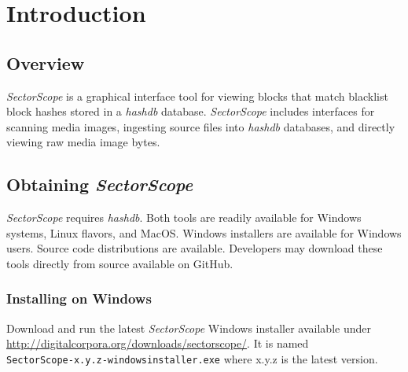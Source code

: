 \documentclass[11pt,fleqn]{article} %
\begin{document}
\newcommand \sscope {\textit{SectorScope}\xspace}
\newcommand \hdb {\textit{hashdb}\xspace}
\newcommand \aut {\textit{Autopsy}\xspace}





\setlength{\parindent}{0pt} %
\newpage
\thispagestyle{empty}
\mbox{}
\newpage

\tableofcontents
\newpage
{}
\newpage

\section{Introduction}
\label{intro}
\subsection {Overview}
\sscope is a graphical interface tool for viewing blocks that match blacklist block hashes stored in a \hdb database. \sscope includes interfaces for scanning media images, ingesting source files into \hdb databases, and directly viewing raw media image bytes.\\

\subsection{Obtaining \sscope}
\label{Obtaining}
\sscope requires \hdb. Both tools are readily available for Windows systems, Linux flavors, and MacOS.  Windows installers are available for Windows users.  Source code distributions are available.  Developers may download these tools directly from source available on GitHub.\\

\subsubsection{Installing on Windows}
Download and run the latest \sscope Windows installer available under \url{http://digitalcorpora.org/downloads/sectorscope/}. It is named\\
\verb+SectorScope-x.y.z-windowsinstaller.exe+ where x.y.z is the latest version.\\
\end{document}
